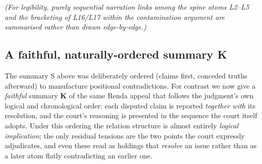 \documentclass[11pt]{article}
\begin{document}
\begin{center}
\end{center}

\noindent\emph{(For legibility, purely sequential narration links among the
spine atoms L2--L5 and the bracketing of L16/L17 within the contamination
argument are summarised rather than drawn edge-by-edge.)}

\subsection*{A faithful, naturally-ordered summary K}

The summary S above was deliberately ordered (claims first, conceded truths
afterward) to manufacture positional contradictions. For contrast we now give a
\emph{faithful} summary \textbf{K} of the same Renda appeal that follows the
judgment's own logical and chronological order: each disputed claim is reported
\emph{together with} its resolution, and the court's reasoning is presented in
the sequence the court itself adopts. Under this ordering the relation structure
is almost entirely \emph{logical implication}; the only residual tensions are the
two points the court expressly adjudicates, and even these read as holdings that
\emph{resolve} an issue rather than as a later atom flatly contradicting an
earlier one.
\end{document}
